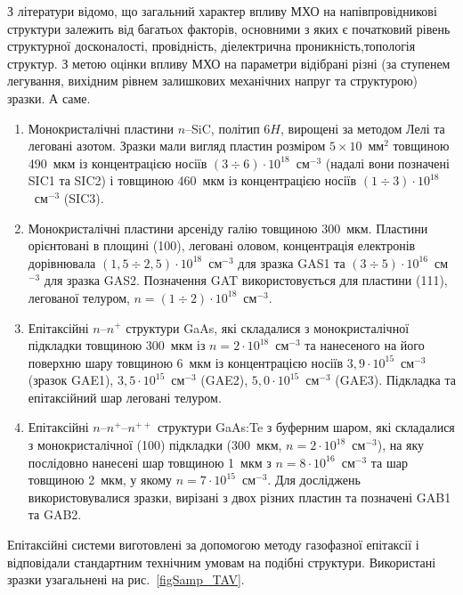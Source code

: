 З літератури \cite{Boltovets,Kr1996,Milenin1994,BelyaevIntac,ASHKINADZE1996,ProcSPIE,Venger1999} відомо,
що загальний характер впливу МХО на напівпровідникові структури залежить від багатьох факторів, основними з яких
є початковий рівень структурної досконалості, провідність, діелектрична проникність,топологія структур.
З метою оцінки впливу МХО на параметри відібрані різні (за ступенем легування, вихідним рівнем залишкових механічних напруг та структурою) зразки.
А саме.
\begin{enumerate}[label=\asbuk*),leftmargin=0em,itemindent=1.5em]
\item Монокристалічні пластини $n$--SiC, політип 6$H$, вирощені  за методом Лелі та леговані азотом.
Зразки мали вигляд пластин розміром $5\times10$~мм$^2$ товщиною 490~мкм із концентрацією носіїв $(3\div6)\cdot10^{18}$~см$^{-3}$ (надалі вони позначені SIC1 та SIC2)
і товщиною 460~мкм із концентрацією носіїв $(1\div3)\cdot10^{18}$~см$^{-3}$ (SIC3).

\item Монокристалічні пластини арсеніду галію товщиною 300~мкм.
Пластини орієнтовані в площині (100), леговані оловом, концентрація електронів дорівнювала $(1,5\div2,5)\cdot10^{18}$~см$^{-3}$ для зразка GAS1
та $(3\div5)\cdot10^{16}$~см$^{-3}$ для зразка GAS2.
Позначення GAT використовується для пластини (111), легованої телуром, $n=(1\div2)\cdot10^{18}$~см$^{-3}$.

\item Епітаксійні $n$--$n^+$ структури GaAs, які складалися з монокристалічної підкладки товщиною 300~мкм із $n=2\cdot10^{18}$~см$^{-3}$
та нанесеного на його поверхню  шару товщиною 6~мкм із концентрацією носіїв $3,9\cdot10^{15}$~см$^{-3}$ (зразок GAE1),
$3,5\cdot10^{15}$~см$^{-3}$ (GAE2), $5,0\cdot10^{15}$~см$^{-3}$ (GAE3).
Підкладка та епітаксійний шар леговані телуром.

\item Епітаксійні $n$--$n^+$--$n^{++}$ структури GaAs:Te з буферним шаром, які складалися з монокристалічної (100) підкладки (300~мкм, $n=2\cdot10^{18}$~см$^{-3}$),
на яку послідовно нанесені шар товщиною 1~мкм з $n=8\cdot10^{16}$~см$^{-3}$
та шар товщиною 2~мкм, у якому $n=7\cdot10^{15}$~см$^{-3}$.
Для досліджень використовувалися зразки, вирізані з двох різних пластин та позначені GAB1 та GAB2.
\end{enumerate}
Епітаксійні системи  виготовлені за допомогою методу газофазної епітаксії і відповідали стандартним технічним умовам на подібні структури.
Використані зразки узагальнені на рис.~\ref{figSamp_TAV}.

